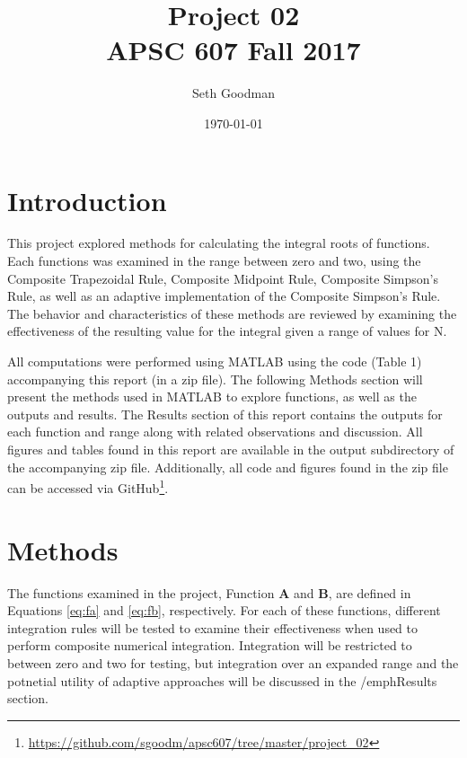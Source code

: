 \documentclass[a4paper]{article}
\title{
	Project 02 \\
	\bigskip
	\normalsize APSC 607 Fall 2017
}
\author{Seth Goodman}
\date{\today}
\begin{document}
\maketitle



\section{Introduction}
\label{sec:introduction}


This project explored methods for calculating the integral roots of functions. Each functions was  examined in the range between zero and two, using the Composite Trapezoidal Rule, Composite Midpoint Rule, Composite Simpson’s Rule, as well as an adaptive implementation of the Composite Simpson’s Rule. The behavior and characteristics of these methods are reviewed by examining the effectiveness of the resulting value for the integral given a range of values for N. 

All computations were performed using MATLAB using the code (Table 1) accompanying this report (in a zip file). The following Methods section will present the methods used in MATLAB to explore functions, as well as the outputs and results. The Results section of this report contains the outputs for each function and range along with related observations and discussion. All figures and tables found in this report are available in the output subdirectory of the accompanying zip file. Additionally, all code and figures found in the zip file can be accessed via GitHub\footnote{\url{https://github.com/sgoodm/apsc607/tree/master/project_02}}.



\newpage
\section{Methods}
\label{sec:methods}

The functions examined in the project, Function \textbf{A} and \textbf{B}, are defined in Equations \ref{eq:fa} and \ref{eq:fb}, respectively. For each of these functions, different integration rules will be tested to examine their effectiveness when used to perform composite numerical integration. Integration will be restricted to between zero and two for testing, but integration over an expanded range and the potnetial utility of adaptive approaches will be discussed in the /emph{Results} section.
\end{document}
